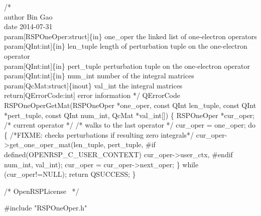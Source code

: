 /*%
    \\author Bin Gao
    \\date 2014-07-31
    \\param[RSPOneOper:struct]\{in\} one_oper the linked list of one-electron operators
    \\param[QInt:int]\{in\} len_tuple length of perturbation tuple on the one-electron operator
    \\param[QInt:int]\{in\} pert_tuple perturbation tuple on the one-electron operator
    \\param[QInt:int]\{in\} num_int number of the integral matrices
    \\param[QcMat:struct]\{inout\} val_int the integral matrices
    \\return[QErrorCode:int] error information
*/
QErrorCode RSPOneOperGetMat(RSPOneOper *one_oper,
                            const QInt len_tuple,
                            const QInt *pert_tuple,
                            const QInt num_int,
                            QcMat *val_int[])
\{
    RSPOneOper *cur_oper;  /* current operator */
    /* walks to the last operator */
    cur_oper = one_oper;
    do \{
/*FIXME: checks perturbations if resulting zero integrals*/
        cur_oper->get_one_oper_mat(len_tuple,
                                   pert_tuple,
#if defined(OPENRSP_C_USER_CONTEXT)
                                   cur_oper->user_ctx,
#endif
                                   num_int,
                                   val_int);
        cur_oper = cur_oper->next_oper;
    \} while (cur_oper!=NULL);
    return QSUCCESS;
\}

\nwendcode{}\endmoddef
/*
  \LA{}OpenRSPLicense~{\nwtagstyle{}}\RA{}
*/

#include "RSPOneOper.h"

